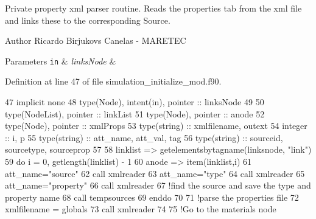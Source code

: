 Private property xml parser routine. Reads the properties tab from the xml file and links these to the corresponding Source. 

\begin{DoxyAuthor}{Author}
Ricardo Birjukovs Canelas -\/ M\+A\+R\+E\+T\+EC 
\end{DoxyAuthor}

\begin{DoxyParams}[1]{Parameters}
\mbox{\tt in}  & {\em links\+Node} & \\
\hline
\end{DoxyParams}


Definition at line 47 of file simulation\+\_\+initialize\+\_\+mod.\+f90.


\begin{DoxyCode}
47     \textcolor{keywordtype}{implicit none}
48     \textcolor{keywordtype}{type}(Node), \textcolor{keywordtype}{intent(in)}, \textcolor{keywordtype}{pointer} :: linksNode
49 
50     \textcolor{keywordtype}{type}(NodeList), \textcolor{keywordtype}{pointer} :: linkList
51     \textcolor{keywordtype}{type}(Node), \textcolor{keywordtype}{pointer} :: anode
52     \textcolor{keywordtype}{type}(Node), \textcolor{keywordtype}{pointer} :: xmlProps
53     \textcolor{keywordtype}{type}(string) :: xmlfilename, outext
54     \textcolor{keywordtype}{integer} :: i, p
55     \textcolor{keywordtype}{type}(string) :: att\_name, att\_val, tag
56     \textcolor{keywordtype}{type}(string) :: sourceid, sourcetype, sourceprop
57     
58     linklist => getelementsbytagname(linksnode, \textcolor{stringliteral}{"link"})
59     \textcolor{keywordflow}{do} i = 0, getlength(linklist) - 1
60         anode => item(linklist,i)
61         att\_name=\textcolor{stringliteral}{"source"}
62         \textcolor{keyword}{call }xmlreader%
63         att\_name=\textcolor{stringliteral}{"type"}
64         \textcolor{keyword}{call }xmlreader%
65         att\_name=\textcolor{stringliteral}{"property"}
66         \textcolor{keyword}{call }xmlreader%
67         \textcolor{comment}{!find the source and save the type and property name}
68         \textcolor{keyword}{call }tempsources%
69 \textcolor{keywordflow}{    enddo}
70 
71     \textcolor{comment}{!parse the properties file}
72     xmlfilename = globals%
73     \textcolor{keyword}{call }xmlreader%
74     
75     \textcolor{comment}{!Go to the materials node}

\end{DoxyCode}
